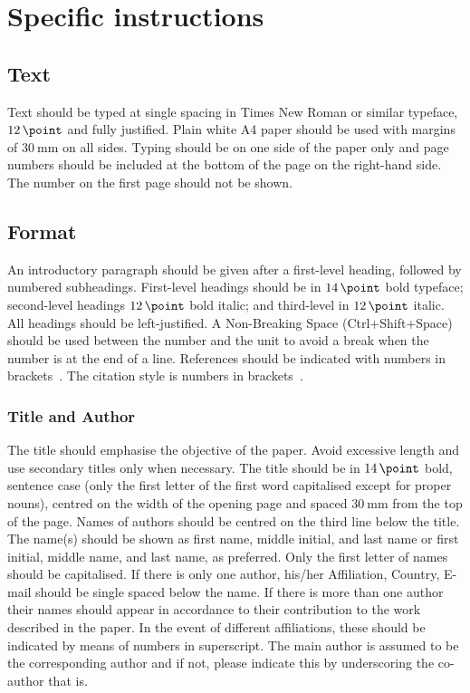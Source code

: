 \documentclass[12pt, a4paper]{article}
\begin{document}
\section{Specific instructions}

\subsection{Text}
Text should be typed at single spacing in Times New Roman or similar typeface, \(\SI{12}{\point}\) and fully justified. Plain white A4 paper should be used with margins of \(\SI{30}{\milli\metre}\) on all sides. Typing should be on one side of the paper only and page numbers should be included at the bottom of the page on the right-hand side. The number on the first page should not be shown.

\subsection{Format}
An introductory paragraph should be given after a first-level heading, followed by numbered subheadings. First-level headings should be in \(\SI{14}{\point}\) bold typeface; second-level headings \(\SI{12}{\point}\) bold italic; and third-level in \(\SI{12}{\point}\) italic. All headings should be left-justified. A Non-Breaking Space (Ctrl+Shift+Space) should be used between the number and the unit to avoid a break when the number is at the end of a line. References should be indicated with numbers in brackets~\cite{Tan1977}. The citation style is numbers in brackets~\cite{Tan1977,Auld1979,Koehler2006}.

\subsubsection{Title and Author}
The title should emphasise the objective of the paper. Avoid excessive length and use secondary titles only when necessary. The title should be in \(\SI{14}{\point}\) bold, sentence case (only the first letter of the first word capitalised except for proper nouns), centred on the width of the opening page and spaced \(\SI{30}{\milli\metre}\) from the top of the page. Names of authors should be centred on the third line below the title. The name(s) should be shown as first name, middle initial, and last name or first initial, middle name, and last name, as preferred. Only the first letter of names should be capitalised. If there is only one author, his/her Affiliation, Country, E-mail should be single spaced below the name. If there is more than one author their names should appear in accordance to their contribution to the work described in the paper. In the event of different affiliations, these should be indicated by means of numbers in superscript. The main author is assumed to be the corresponding author and if not, please indicate this by underscoring the co-author that is.
\end{document}
